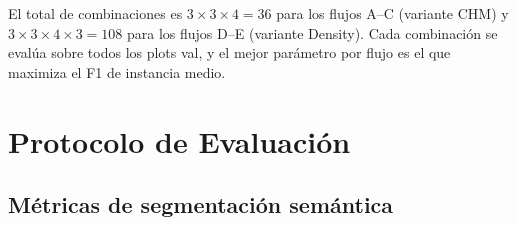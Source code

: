 \documentclass[runningheads]{llncs}
\begin{document}
\begin{table}[t]
\centering
\caption{Espacio de b\'usqueda del grid search del Watershed~3D y par\'ametros \'optimos por flujo (calibrados sobre el split val maximizando F1 de instancia con IoU 3D~$\geq 0.5$).}\label{tab:grid-search}
\end{table}

El total de combinaciones es $3 \times 3 \times 4 = 36$ para los flujos A--C (variante CHM) y $3 \times 3 \times 4 \times 3 = 108$ para los flujos D--E (variante Density). Cada combinaci\'on se eval\'ua sobre todos los plots val, y el mejor par\'ametro por flujo es el que maximiza el F1 de instancia medio.

\section{Protocolo de Evaluaci\'on}\label{sec:eval}

\subsection{M\'etricas de segmentaci\'on sem\'antica}
\end{document}
